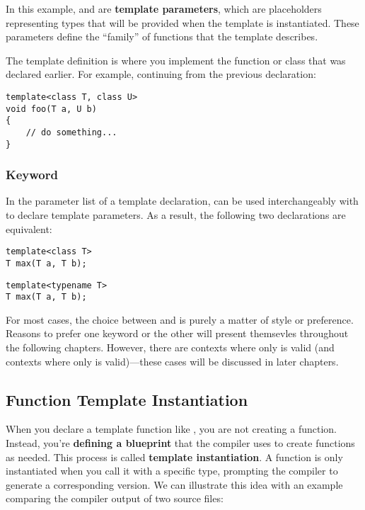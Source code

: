 \documentclass[12pt]{article}
\begin{document}
\noindent
In this example,  and  are \textbf{template parameters}, which are placeholders representing types that will be provided when the template is instantiated.
These parameters define the ``family'' of functions that the template describes.

\vspace{1em}
\noindent
The template definition is where you implement the function or class that was declared earlier.
For example, continuing from the previous declaration:

\begin{lstlisting}[style=cxx]
template<class T, class U>
void foo(T a, U b)
{
    // do something...
}
\end{lstlisting}

\subsubsection{ Keyword}

\noindent
In the parameter list of a template declaration,  can be used interchangeably with  to declare template parameters.
As a result, the following two declarations are equivalent:

\begin{lstlisting}[style=cxx]
template<class T>
T max(T a, T b);
\end{lstlisting}

\begin{lstlisting}[style=cxx]
template<typename T>
T max(T a, T b);
\end{lstlisting}

\noindent
For most cases, the choice between  and  is purely a matter of style or preference.
Reasons to prefer one keyword or the other will present themsevles throughout the following chapters.
However, there are contexts where only  is valid (and contexts where only  is valid)—these cases will be discussed in later chapters.

\subsection{Function Template Instantiation}

\noindent
When you declare a template function like , you are not creating a function.
Instead, you're \textbf{defining a blueprint} that the compiler uses to create functions as needed.
This process is called \textbf{template instantiation}.
A function is only instantiated when you call it with a specific type, prompting the compiler to generate a corresponding version.
We can illustrate this idea with an example comparing the compiler output of two source files:
\end{document}
